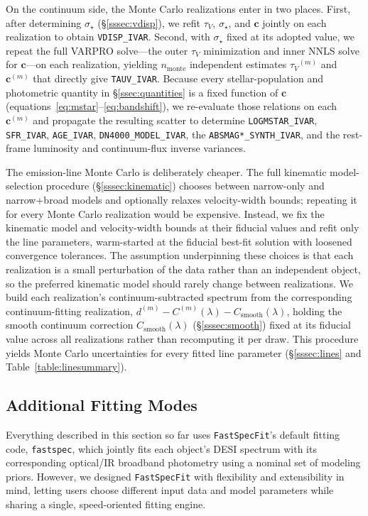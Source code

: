 \documentclass[modern,linenumbers]{aastex702}
\newcommand{\fastspecfit}{\texttt{FastSpecFit}}
\newcommand{\fastspec}{\texttt{fastspec}}
\newcommand{\vdisp}{\ensuremath{\sigma_\star}}
\newcommand{\tauv}{\ensuremath{\tau_V}}
\begin{document}
On the continuum side, the Monte Carlo realizations enter in two
places. First, after determining \vdisp{} (\S\ref{sssec:vdisp}), we
refit \tauv, \vdisp, and $\mathbf{c}$ jointly on each realization to
obtain \texttt{VDISP\_IVAR}. Second, with \vdisp{} fixed at its
adopted value, we repeat the full VARPRO solve---the outer \tauv{}
minimization and inner NNLS solve for $\mathbf{c}$---on each
realization, yielding $n_\mathrm{monte}$ independent estimates
$\tauv^{(m)}$ and $\mathbf{c}^{(m)}$ that directly give
\texttt{TAUV\_IVAR}. Because every stellar-population and photometric
quantity in \S\ref{ssec:quantities} is a fixed function of
$\mathbf{c}$ (equations~\ref{eq:mstar}--\ref{eq:bandshift}), we
re-evaluate those relations on each $\mathbf{c}^{(m)}$ and propagate
the resulting scatter to determine \texttt{LOGMSTAR\_IVAR},
\texttt{SFR\_IVAR}, \texttt{AGE\_IVAR}, \texttt{DN4000\_MODEL\_IVAR},
the \texttt{ABSMAG*\_SYNTH\_IVAR}, and the rest-frame luminosity and
continuum-flux inverse variances.

The emission-line Monte Carlo is deliberately cheaper. The full
kinematic model-selection procedure (\S\ref{sssec:kinematic}) chooses
between narrow-only and narrow+broad models and optionally relaxes
velocity-width bounds; repeating it for every Monte Carlo realization
would be expensive. Instead, we fix the kinematic model and
velocity-width bounds at their fiducial values and refit only the line
parameters, warm-started at the fiducial best-fit solution with
loosened convergence tolerances. The assumption underpinning these
choices is that each realization is a small perturbation of the data
rather than an independent object, so the preferred kinematic model
should rarely change between realizations. We build each realization's
continuum-subtracted spectrum from the corresponding continuum-fitting
realization, $d^{(m)} - C^{(m)}(\lambda) -
C_\mathrm{smooth}(\lambda)$, holding the smooth continuum correction
$C_\mathrm{smooth}(\lambda)$ (\S\ref{sssec:smooth}) fixed at its
fiducial value across all realizations rather than recomputing it per
draw. This procedure yields Monte Carlo uncertainties for every fitted
line parameter (\S\ref{sssec:lines} and
Table~\ref{table:linesummary}).

\subsection{Additional Fitting Modes}
\label{sec:modes}

Everything described in this section so far uses \fastspecfit{}'s
default fitting code, \fastspec, which jointly fits each object's DESI
spectrum with its corresponding optical/IR broadband photometry using
a nominal set of modeling priors. However, we designed \fastspecfit{}
with flexibility and extensibility in mind, letting users choose
different input data and model parameters while sharing a single,
speed-oriented fitting engine.
\end{document}
